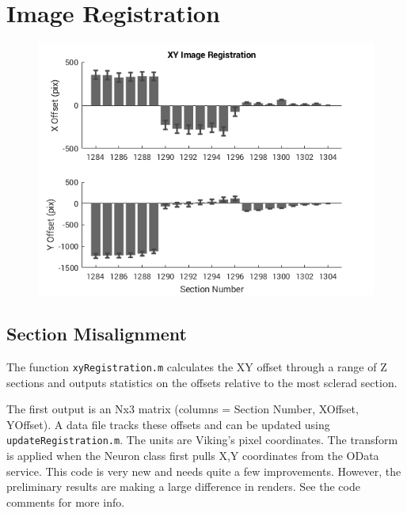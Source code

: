 \documentclass[12pt]{exam}
\begin{document}
	\section{Image Registration}
	\begin{figure}
		\includegraphics[width=\linewidth]{xyAlign}
	\end{figure}
	\subsection{Section Misalignment}

	The function \texttt{xyRegistration.m} calculates the XY offset through a range of Z sections and outputs statistics on the offsets relative to the most sclerad section. 
	
	The first output is an Nx3 matrix (columns = Section Number, XOffset, YOffset). A data file tracks these offsets and can be updated using \texttt{updateRegistration.m}. The units are Viking's pixel coordinates. The transform is applied when the Neuron class first pulls X,Y coordinates from the OData service. This code is very new and needs quite a few improvements. However, the preliminary results are making a large difference in renders. See the code comments for more info.
\end{document}
